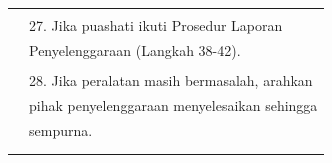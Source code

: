 \documentclass[
]{article}
\begin{document}
\begin{longtable}[]{@{}ll@{}}
\begin{minipage}[t]{0.71\columnwidth}
\strut
\end{minipage}\tabularnewline
\begin{minipage}[t]{0.23\columnwidth}\raggedright
\strut
\end{minipage} & \begin{minipage}[t]{0.71\columnwidth}\raggedright
27. Jika puashati ikuti Prosedur Laporan\strut
\end{minipage}\tabularnewline
\begin{minipage}[t]{0.23\columnwidth}\raggedright
\strut
\end{minipage} & \begin{minipage}[t]{0.71\columnwidth}\raggedright
Penyelenggaraan (Langkah 38-42).\strut
\end{minipage}\tabularnewline
\begin{minipage}[t]{0.23\columnwidth}\raggedright
\strut
\end{minipage} & \begin{minipage}[t]{0.71\columnwidth}\raggedright
\strut
\end{minipage}\tabularnewline
\begin{minipage}[t]{0.23\columnwidth}\raggedright
\strut
\end{minipage} & \begin{minipage}[t]{0.71\columnwidth}\raggedright
28. Jika peralatan masih bermasalah, arahkan\strut
\end{minipage}\tabularnewline
\begin{minipage}[t]{0.23\columnwidth}\raggedright
\strut
\end{minipage} & \begin{minipage}[t]{0.71\columnwidth}\raggedright
pihak penyelenggaraan menyelesaikan sehingga\strut
\end{minipage}\tabularnewline
\begin{minipage}[t]{0.23\columnwidth}\raggedright
\strut
\end{minipage} & \begin{minipage}[t]{0.71\columnwidth}\raggedright
sempurna.\strut
\end{minipage}\tabularnewline
\begin{minipage}[t]{0.23\columnwidth}\raggedright
\strut
\end{minipage} & \begin{minipage}[t]{0.71\columnwidth}\raggedright
\strut
\end{minipage}\tabularnewline
\begin{minipage}[t]{0.23\columnwidth}\raggedright
\strut
\end{minipage} & \begin{minipage}[t]{0.71\columnwidth}\raggedright

\end{minipage}
\end{longtable}
\end{document}
